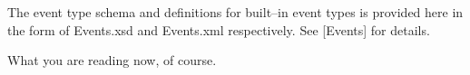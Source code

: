 


The event type schema and definitions for built--in event types is provided here in the form of Events.xsd and Events.xml respectively. See [Events] for details.


What you are reading now, of course.
\stopitemize

